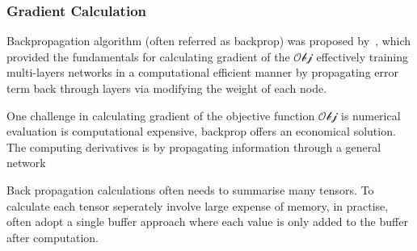 \subsubsection{Gradient Calculation}
Backpropagation algorithm (often referred as backprop) was proposed by~\citet{werbos1975beyond}, which provided the fundamentals for calculating gradient of the $\mathcal{Obj}$ effectively  training multi-layers networks in a computational efficient manner by propagating error term back through layers via modifying the weight of each node. 
\par
One challenge in calculating gradient of the objective function $\mathcal{Obj}$ is numerical evaluation is computational expensive, backprop offers an economical solution. The computing derivatives is by propagating information through a general network 
\par 
Back propagation calculations often needs to summarise many tensors. To calculate each tensor seperately involve large expense of memory, in practise, often adopt a single buffer approach where each value is only added to the buffer after computation.